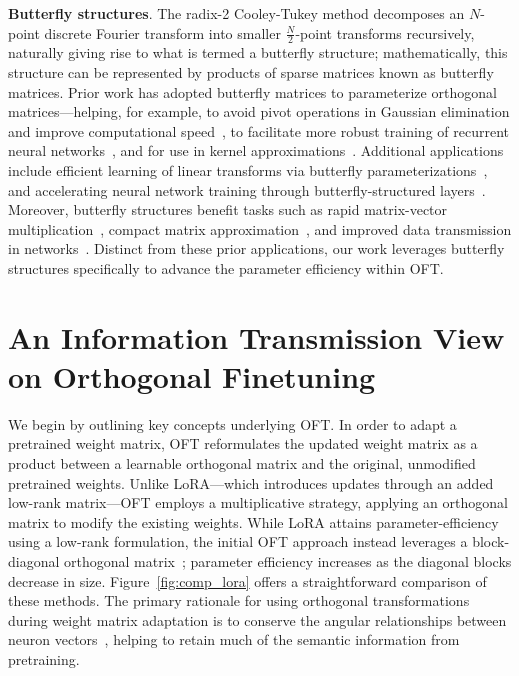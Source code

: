 \textbf{Butterfly structures}. The radix-2 Cooley-Tukey method decomposes an $N$-point discrete Fourier transform into smaller $\frac{N}{2}$-point transforms recursively, naturally giving rise to what is termed a butterfly structure; mathematically, this structure can be represented by products of sparse matrices known as butterfly matrices. Prior work has adopted butterfly matrices to parameterize orthogonal matrices—helping, for example, to avoid pivot operations in Gaussian elimination and improve computational speed~\cite{parker1995random}, to facilitate more robust training of recurrent neural networks~\cite{jing2017tunable}, and for use in kernel approximations~\cite{munkhoeva2018quadrature}. Additional applications include efficient learning of linear transforms via butterfly parameterizations~\cite{dao2019learning,dao2019kaleidoscope}, and accelerating neural network training through butterfly-structured layers~\cite{chen2022pixelated,dao2022monarch}. Moreover, butterfly structures benefit tasks such as rapid matrix-vector multiplication~\cite{michielssen1996multilevel,o2010algorithm}, compact matrix approximation~\cite{li2015butterfly}, and improved data transmission in networks~\cite{klasing1994broadcasting,li2003linear,rajasingh2016transmission}. Distinct from these prior applications, our work leverages butterfly structures specifically to advance the parameter efficiency within OFT.

\section{An Information Transmission View on Orthogonal Finetuning}

We begin by outlining key concepts underlying OFT. In order to adapt a pretrained weight matrix, OFT reformulates the updated weight matrix as a product between a learnable orthogonal matrix and the original, unmodified pretrained weights. Unlike LoRA—which introduces updates through an added low-rank matrix—OFT employs a multiplicative strategy, applying an orthogonal matrix to modify the existing weights. While LoRA attains parameter-efficiency using a low-rank formulation, the initial OFT approach instead leverages a block-diagonal orthogonal matrix~\cite{qiu2023controlling}; parameter efficiency increases as the diagonal blocks decrease in size. Figure~\ref{fig:comp_lora} offers a straightforward comparison of these methods. The primary rationale for using orthogonal transformations during weight matrix adaptation is to conserve the angular relationships between neuron vectors~\cite{liu2018learning,liu2021orthogonal,qiu2023controlling}, helping to retain much of the semantic information from pretraining.

